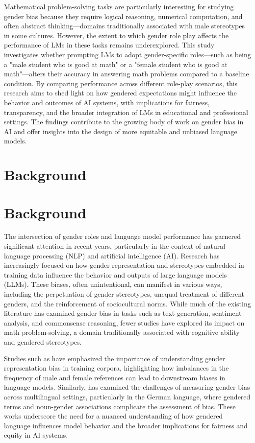 \documentclass{article}
\begin{document}
Mathematical problem-solving tasks are particularly interesting for studying gender bias because they require logical reasoning, numerical computation, and often abstract thinking—domains traditionally associated with male stereotypes in some cultures. However, the extent to which gender role play affects the performance of LMs in these tasks remains underexplored. This study investigates whether prompting LMs to adopt gender-specific roles—such as being a "male student who is good at math" or a "female student who is good at math"—alters their accuracy in answering math problems compared to a baseline condition. By comparing performance across different role-play scenarios, this research aims to shed light on how gendered expectations might influence the behavior and outcomes of AI systems, with implications for fairness, transparency, and the broader integration of LMs in educational and professional settings. The findings contribute to the growing body of work on gender bias in AI and offer insights into the design of more equitable and unbiased language models.
\section{Background}
\section*{Background}

The intersection of gender roles and language model performance has garnered significant attention in recent years, particularly in the context of natural language processing (NLP) and artificial intelligence (AI). Research has increasingly focused on how gender representation and stereotypes embedded in training data influence the behavior and outputs of large language models (LLMs). These biases, often unintentional, can manifest in various ways, including the perpetuation of gender stereotypes, unequal treatment of different genders, and the reinforcement of sociocultural norms. While much of the existing literature has examined gender bias in tasks such as text generation, sentiment analysis, and commonsense reasoning, fewer studies have explored its impact on math problem-solving, a domain traditionally associated with cognitive ability and gendered stereotypes.

Studies such as \cite{2406.13677v3} have emphasized the importance of understanding gender representation bias in training corpora, highlighting how imbalances in the frequency of male and female references can lead to downstream biases in language models. Similarly, \cite{2507.16557v1} has examined the challenges of measuring gender bias across multilingual settings, particularly in the German language, where gendered terms and noun-gender associations complicate the assessment of bias. These works underscore the need for a nuanced understanding of how gendered language influences model behavior and the broader implications for fairness and equity in AI systems.
\end{document}
